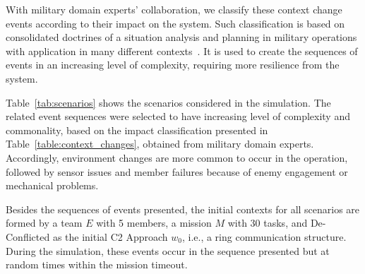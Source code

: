





With military domain experts' collaboration, we classify these context change events according to their impact on the system. Such classification is based on consolidated doctrines of a situation analysis and planning in military operations with application in many different contexts~\citep{nato01, doctrine01, Fernandes2016, UAV_Aplication, CC03, UAV01}. It is used to create the sequences of events \color{black} in an increasing level of complexity\color{black}, requiring more resilience from the system. 

Table~\ref{tab:scenarios} shows the scenarios considered in the simulation. 
\color{black} The related event sequences were selected to have increasing level of complexity and commonality, based on the impact classification presented in Table~\ref{table:context_changes}, obtained from military domain experts. Accordingly, environment changes are more common to occur in the operation, followed by sensor issues and member failures because of enemy engagement or mechanical problems.
\color{black}

Besides the sequences of events presented, the initial contexts for all scenarios are formed by a team $E$ with 5 members, a mission $M$ with 30 tasks, and De-Conflicted as the initial C2 Approach $w_0$, i.e., a ring communication structure. During the simulation, these events occur in the sequence presented but at random times within the mission timeout.



